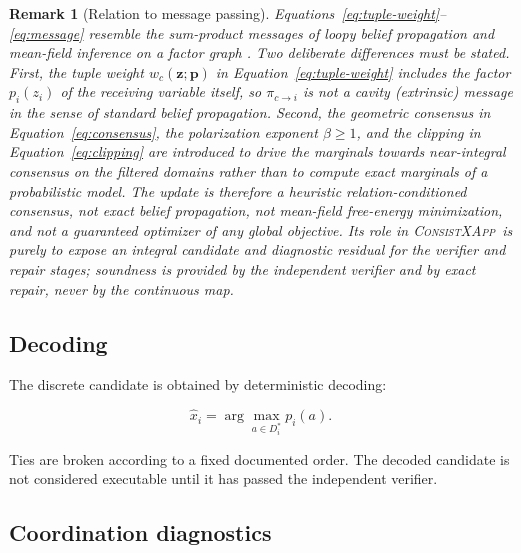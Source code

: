 \documentclass[pdflatex,sn-mathphys-num,iicol,oneside]{sn-jnl}
\newcommand{\method}{\textsc{ConsistXApp}}
\newtheorem{remark}{Remark}
\begin{document}
\begin{remark}[Relation to message passing]
Equations~\eqref{eq:tuple-weight}--\eqref{eq:message} resemble the
sum-product messages of loopy belief propagation and mean-field
inference on a factor graph
\cite{yedidia2003understanding,wainwright2005map,bayati2011bmatching}.
Two deliberate differences must be stated. First, the tuple weight
$w_c(\bm{z};\bm{p})$ in Equation~\eqref{eq:tuple-weight} includes the
factor $p_i(z_i)$ of the receiving variable itself, so
$\pi_{c\rightarrow i}$ is not a cavity (extrinsic) message in the sense
of standard belief propagation. Second, the geometric consensus in
Equation~\eqref{eq:consensus}, the polarization exponent
$\beta\geq 1$, and the clipping in Equation~\eqref{eq:clipping} are
introduced to drive the marginals towards near-integral consensus on
the filtered domains rather than to compute exact marginals of a
probabilistic model. The update is therefore a heuristic
relation-conditioned consensus, not exact belief propagation, not
mean-field free-energy minimization, and not a guaranteed optimizer of
any global objective. Its role in \method\ is purely to expose an
integral candidate and diagnostic residual for the verifier and
repair stages; soundness is provided by the independent verifier and
by exact repair, never by the continuous map.
\end{remark}

\subsection{Decoding}

The discrete candidate is obtained by deterministic decoding:

\begin{equation}
\widehat{x}_i
=
\arg\max_{a\in D_i^{*}}p_i(a).
\label{eq:decode}
\end{equation}

Ties are broken according to a fixed documented order. The decoded
candidate is not considered executable until it has passed the
independent verifier.

\subsection{Coordination diagnostics}
\end{document}
